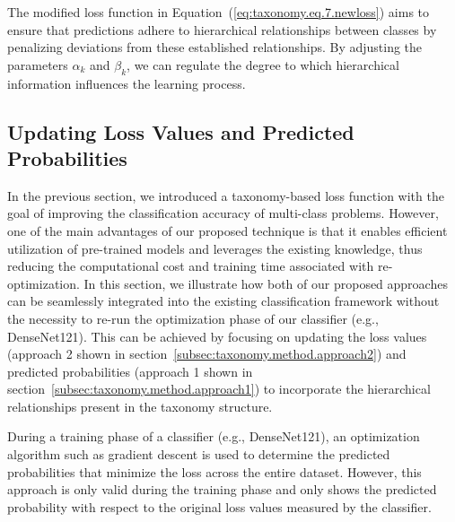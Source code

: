The modified loss function in Equation~(\ref{eq:taxonomy.eq.7.newloss})  aims to ensure that predictions adhere to hierarchical relationships between classes by penalizing deviations from these established relationships. By adjusting the parameters $\alpha_k $ and $\beta_k $, we can regulate the degree to which hierarchical information influences the learning process.

\subsection{Updating Loss Values and Predicted Probabilities}\label{subsec:updating-loss-values-and-predicted-probabilities}

In the previous section, we introduced a taxonomy-based loss function with the goal of improving the classification accuracy of multi-class problems. However, one of the main advantages of our proposed technique is that it enables efficient utilization of pre-trained models and leverages the existing knowledge, thus reducing the computational cost and training time associated with re-optimization. In this section, we illustrate how both of our proposed approaches can be seamlessly integrated into the existing classification framework without the necessity to re-run the optimization phase of our classifier (e.g., DenseNet121). This can be achieved by focusing on updating the loss values (approach 2 shown in section~\ref{subsec:taxonomy.method.approach2}) and predicted probabilities (approach 1 shown in section~\ref{subsec:taxonomy.method.approach1}) to incorporate the hierarchical relationships present in the taxonomy structure.

During a training phase of a classifier (e.g., DenseNet121), an optimization algorithm such as gradient descent is used to determine the predicted probabilities that minimize the loss across the entire dataset. However, this approach is only valid during the training phase and only shows the predicted probability with respect to the original loss values measured by the classifier.

